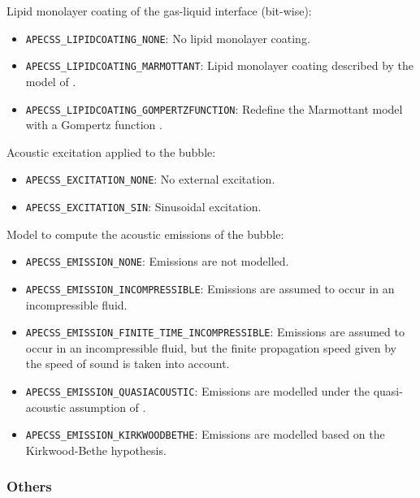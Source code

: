 Lipid monolayer coating of the gas-liquid interface (bit-wise):\vspace{-1em}
\begin{itemize}[noitemsep]
  \item {\tt APECSS\_LIPIDCOATING\_NONE}: No lipid monolayer coating.
  \item {\tt APECSS\_LIPIDCOATING\_MARMOTTANT}: Lipid monolayer coating described by the model of \citet{Marmottant2005}.
  \item {\tt APECSS\_LIPIDCOATING\_GOMPERTZFUNCTION}: Redefine the Marmottant model with a Gompertz function \citep{Guemmer2021}.
\end{itemize}

Acoustic excitation applied to the bubble:\vspace{-1em}
\begin{itemize}[noitemsep]
  \item {\tt APECSS\_EXCITATION\_NONE}: No external excitation. 
  \item {\tt APECSS\_EXCITATION\_SIN}: Sinusoidal excitation.
\end{itemize}

Model to compute the acoustic emissions of the bubble:\vspace{-1em}
\begin{itemize}[noitemsep]
  \item {\tt APECSS\_EMISSION\_NONE}: Emissions are not modelled.
  \item {\tt APECSS\_EMISSION\_INCOMPRESSIBLE}: Emissions are assumed to occur in an incompressible fluid.
  \item {\tt APECSS\_EMISSION\_FINITE\_TIME\_INCOMPRESSIBLE}: Emissions are assumed to occur in an incompressible fluid, but the finite propagation speed given by the speed of sound is taken into account.
  \item {\tt APECSS\_EMISSION\_QUASIACOUSTIC}: Emissions are modelled under the quasi-acoustic assumption of \citet{Gilmore1952}.
  \item {\tt APECSS\_EMISSION\_KIRKWOODBETHE}: Emissions are modelled based on the Kirkwood-Bethe hypothesis.
\end{itemize}


\subsubsection{Others}

